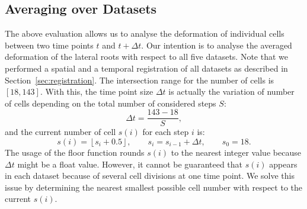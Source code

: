 \documentclass[11pt,a4paper, final]{article}
\begin{document}
\subsection{Averaging over Datasets}
\noindent
The above evaluation allows us to analyse the deformation of individual cells between two time points $t$ and $t + \Delta t$. Our intention is to analyse the averaged deformation of the lateral roots with respect to all five datasets. Note that we performed a spatial and a temporal registration of all datasets as described in Section~\ref{sec:registration}. The intersection range for the number of cells is $[18, 143]$. With this, the time point size $\Delta t$ is actually the variation of number of cells depending on the total number of considered steps $S$:
\begin{equation}
\Delta t = \frac{143 - 18}{S},
\end{equation}
and the current number of cell $s(i)$ for each step $i$ is:
\begin{equation}
s(i) = \left\lfloor s_i + 0.5 \right\rfloor, \qquad s_i = s_{i-1} + \Delta t, \qquad s_0 = 18.
\end{equation}
The usage of the floor function rounds $s(i)$ to the nearest integer value because $\Delta t$ might be a float value. However, it cannot be guaranteed that $s(i)$ appears in each dataset because of several cell divisions at one time point. We solve this issue by determining the nearest smallest possible cell number with respect to the current $s(i)$.
\end{document}
